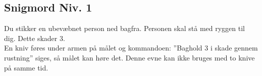 \subsection*{Snigmord Niv. 1}
Du stikker en ubevæbnet person ned bagfra. Personen skal stå med ryggen til dig. Dette skader 3.\\ 
En kniv føres under armen på målet og kommandoen: ”Baghold 3 i skade gennem rustning” siges, så målet kan høre det. Denne evne kan ikke bruges med to knive på samme tid.\\